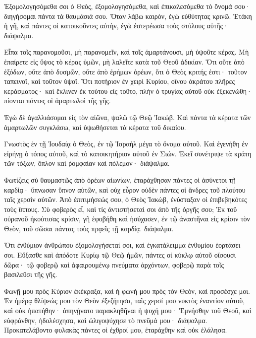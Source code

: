 \begin{spacing}{1.1}
\begin{multicols}{2}
Ἐξομολογησόμεθα σοι ὁ Θεὸς, ἐξομολογησόμεθα, καὶ ἐπικαλεσόμεθα τὸ ὄνομά σου· διηγήσομαι πάντα τὰ θαυμάσιά σου.
Ὅταν λάβω καιρὸν, ἐγὼ εὐθύτητας κρινῶ.
Ἐτάκη ἡ γῆ, καὶ πάντες οἱ κατοικοῦντες αὐτὴν, ἐγὼ ἐστερέωσα τοὺς στύλους αὐτῆς· διάψαλμα.

Εἶπα τοῖς παρανομοῦσι, μὴ παρανομεῖν, καὶ τοῖς ἁμαρτάνουσι, μὴ ὑψοῦτε κέρας.
Μὴ ἐπαίρετε εἰς ὕψος τὸ κέρας ὑμῶν, μὴ λαλεῖτε κατὰ τοῦ Θεοῦ ἀδικίαν.
Ὅτι οὔτε ἀπὸ ἐξόδων, οὔτε ἀπὸ δυσμῶν, οὔτε ἀπὸ ἐρήμων ὀρέων,
ὅτι ὁ Θεὸς κριτής ἐστι· τοῦτον ταπεινοῖ, καὶ τοῦτον ὑψοῖ.
Ὅτι ποτήριον ἐν χειρὶ Κυρίου, οἴνου ἀκράτου πλῆρες κεράσματος· καὶ ἔκλινεν ἐκ τούτου εἰς τοῦτο, πλὴν ὁ τρυγίας αὐτοῦ οὐκ ἐξεκενώθη· πίονται πάντες οἱ ἁμαρτωλοὶ τῆς γῆς.

Ἐγὼ δὲ ἀγαλλιάσομαι εἰς τὸν αἰῶνα, ψαλῶ τῷ Θεῷ Ἰακώβ.
Καὶ πάντα τὰ κέρατα τῶν ἁμαρτωλῶν συγκλάσω, καὶ ὑψωθήσεται τὰ κέρατα τοῦ δικαίου.

Γνωστὸς ἐν τῇ Ἰουδαίᾳ ὁ Θεὸς, ἐν τῷ Ἰσραὴλ μέγα τὸ ὄνομα αὐτοῦ.
Καὶ ἐγενήθη ἐν εἰρήνῃ ὁ τόπος αὐτοῦ, καὶ τὸ κατοικητήριον αὐτοῦ ἐν Σιών.
Ἐκεῖ συνέτριψε τὰ κράτη τῶν τόξων, ὅπλον καὶ ῥομφαίαν καὶ πόλεμον· διάψαλμα.

Φωτίζεις σὺ θαυμαστῶς ἀπὸ ὀρέων αἰωνίων,
ἐταράχθησαν πάντες οἱ ἀσύνετοι τῇ καρδίᾳ· ὕπνωσαν ὕπνον αὐτῶν, καὶ οὐχ εὗρον οὐδὲν πάντες οἱ ἄνδρες τοῦ πλούτου ταῖς χερσὶν αὐτῶν.
Ἀπὸ ἐπιτιμήσεώς σου, ὁ Θεὸς Ἰακὼβ, ἐνύσταξαν οἱ ἐπιβεβηκότες τοὺς ἵππους.
Σὺ φοβερὸς εἶ, καὶ τίς ἀντιστήσεταί σοι ἀπὸ τῆς ὀργῆς σου;
Ἐκ τοῦ οὐρανοῦ ἠκούτισας κρίσιν, γῆ ἐφοβήθη καὶ ἡσύχασεν,
ἐν τῷ ἀναστῆναι εἰς κρίσιν τὸν Θεὸν, τοῦ σῶσαι πάντας τοὺς πρᾳεῖς τῇ καρδίᾳ. διάψαλμα.

Ὅτι ἐνθύμιον ἀνθρώπου ἐξομολογήσεταί σοι, καὶ ἐγκατάλειμμα ἐνθυμίου ἑορτάσει σοι.
Εὔξασθε καὶ ἀπόδοτε Κυρίῳ τῷ Θεῷ ἡμῶν, πάντες οἱ κύκλῳ αὐτοῦ οἴσουσι δῶρα·
τῷ φοβερῷ καὶ ἀφαιρουμένῳ πνεύματα ἀρχόντων, φοβερῷ παρὰ τοῖς βασιλεῦσι τῆς γῆς.

Φωνῇ μου πρὸς Κύριον ἐκέκραξα, καὶ ἡ φωνή μου πρὸς τὸν Θεὸν, καὶ προσέσχε μοι.
Ἐν ἡμέρᾳ θλίψεώς μου τὸν Θεὸν ἐξεζήτησα, ταῖς χερσί μου νυκτὸς ἐναντίον αὐτοῦ, καὶ οὐκ ἠπατήθην· ἀπηνῄνατο παρακληθῆναι ἡ ψυχή μου·
Ἐμνήσθην τοῦ Θεοῦ, καὶ εὐφράνθην, ἠδολέσχησα, καὶ ὠλιγοψύχησε τὸ πνεῦμά μου· διάψαλμα.
Προκατελάβοντο φυλακὰς πάντες οἱ ἐχθροί μου, ἐταράχθην καὶ οὐκ ἐλάλησα.


\end{multicols}
\end{spacing}
